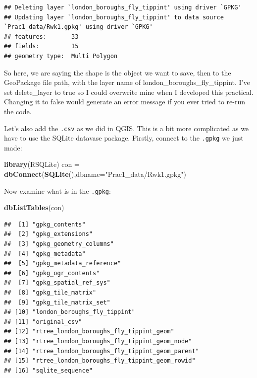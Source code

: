 \documentclass[]{book}
\newenvironment{Shaded}{\begin{snugshade}}{\end{snugshade}}
\newcommand{\DataTypeTok}[1]{\textcolor[rgb]{0.13,0.29,0.53}{#1}}
\newcommand{\KeywordTok}[1]{\textcolor[rgb]{0.13,0.29,0.53}{\textbf{#1}}}
\newcommand{\NormalTok}[1]{#1}
\newcommand{\StringTok}[1]{\textcolor[rgb]{0.31,0.60,0.02}{#1}}
\begin{document}
\begin{verbatim}
## Deleting layer `london_boroughs_fly_tippint' using driver `GPKG'
## Updating layer `london_boroughs_fly_tippint' to data source `Prac1_data/Rwk1.gpkg' using driver `GPKG'
## features:       33
## fields:         15
## geometry type:  Multi Polygon
\end{verbatim}

So here, we are saying the shape is the object we want to save, then to the GeoPackage file path, with the layer name of london\_boroughs\_fly\_tippint. I've set delete\_layer to true so I could overwrite mine when I developed this practical. Changing it to false would generate an error message if you ever tried to re-run the code.

Let's also add the \texttt{.csv} as we did in QGIS. This is a bit more complicated as we have to use the SQLite datavase package. Firstly, connect to the \texttt{.gpkg} we just made:

\begin{Shaded}
\begin{Highlighting}[]
\KeywordTok{library}\NormalTok{(RSQLite)}
\NormalTok{con =}\StringTok{ }\KeywordTok{dbConnect}\NormalTok{(}\KeywordTok{SQLite}\NormalTok{(),}\DataTypeTok{dbname=}\StringTok{"Prac1_data/Rwk1.gpkg"}\NormalTok{)}
\end{Highlighting}
\end{Shaded}

Now examine what is in the \texttt{.gpkg}:

\begin{Shaded}
\begin{Highlighting}[]
\KeywordTok{dbListTables}\NormalTok{(con)}
\end{Highlighting}
\end{Shaded}

\begin{verbatim}
##  [1] "gpkg_contents"                                
##  [2] "gpkg_extensions"                              
##  [3] "gpkg_geometry_columns"                        
##  [4] "gpkg_metadata"                                
##  [5] "gpkg_metadata_reference"                      
##  [6] "gpkg_ogr_contents"                            
##  [7] "gpkg_spatial_ref_sys"                         
##  [8] "gpkg_tile_matrix"                             
##  [9] "gpkg_tile_matrix_set"                         
## [10] "london_boroughs_fly_tippint"                  
## [11] "original_csv"                                 
## [12] "rtree_london_boroughs_fly_tippint_geom"       
## [13] "rtree_london_boroughs_fly_tippint_geom_node"  
## [14] "rtree_london_boroughs_fly_tippint_geom_parent"
## [15] "rtree_london_boroughs_fly_tippint_geom_rowid" 
## [16] "sqlite_sequence"
\end{verbatim}
\end{document}
